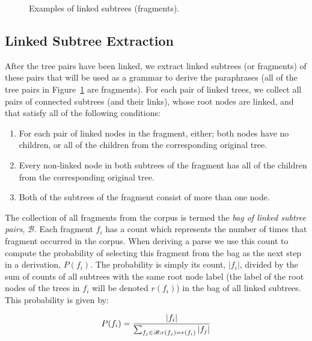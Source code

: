 \begin{figure}[t] 
\begin{center}
\epsfxsize=6cm
\mbox{}
\end{center}
\vspace{-0.2in}
\caption{Examples of linked subtrees (fragments).}
\label{fig:fragments}
\end{figure}

\subsection{Linked Subtree Extraction}
\label{sec:fragments}

After the tree pairs have been linked, we extract linked subtrees (or fragments) of these pairs
that will be used as a grammar to derive the paraphrases (all of the tree pairs in Figure~\ref{fig:fragments}
are fragments). For each pair of linked trees, we collect all pairs of connected subtrees (and their
links), whose root nodes are linked, and  that satisfy all of the following conditions:

\begin{enumerate}
\item For each pair of linked nodes in the fragment, either; both nodes have no children, or all of the 
children from the corresponding original tree.
\item Every non-linked node in both subtrees of the fragment has all of the 
children from the corresponding original tree.
\item Both of the subtrees of the fragment consist of more than one node.
\end{enumerate}

The collection of all fragments from the corpus is termed the {\em bag of linked subtree pairs},  $\mathscr{B}$.
Each fragment $f_i$ has a count which represents the number of times that fragment occurred in the corpus.
When deriving a parse we use this count to compute the probability of selecting this fragment 
from the bag as the next step in a derivation, $P(f_i)$. The probability is simply its count, $\vert f_i \vert$,
divided by the sum of counts of all subtrees with the same root node label 
(the label of the root nodes of the trees in $f_i$ will be denoted $r(f_i)$)
in the bag of all linked subtrees. This probability is given by:

\begin{equation}
P( f_i ) = { \vert f_i \vert \over \sum_{f_j \in \mathscr{B}:r(f_j)=r(f_i)} \vert f_j \vert }
\end{equation}


